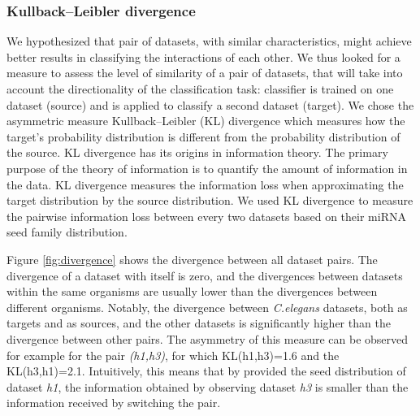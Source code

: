 \documentclass{bmcart}
\begin{document}
\subsubsection*{Kullback–Leibler divergence}
We hypothesized that pair of datasets, with similar characteristics, might achieve better results in classifying the interactions of each other. We thus looked for a measure to assess the level of similarity of a pair of datasets, that will take into account the directionality of the classification task: classifier is trained on one dataset (source) and is applied to classify a second dataset (target).
We chose the asymmetric measure Kullback–Leibler (KL) divergence which measures how the target's probability distribution is different from the probability distribution of the source. KL divergence has its origins in information theory. The primary purpose of the theory of information is to quantify the amount of information in the data. KL divergence measures the information loss when approximating the target distribution by the source distribution. We used KL divergence to measure the pairwise information loss between every two datasets based on their miRNA seed family distribution.

Figure \ref{fig:divergence} shows the divergence between all dataset pairs. The divergence of a dataset with itself is zero, and the divergences between datasets within the same organisms are usually lower than the divergences between different organisms. Notably, the divergence between \textit{C.elegans} datasets, both as targets and as sources, and the other datasets is significantly higher than the divergence between other pairs. The asymmetry of this measure can be observed for example for the pair \textit{(h1,h3)}, for which KL(h1,h3)=1.6 and the KL(h3,h1)=2.1. Intuitively, this means that by provided the seed distribution of dataset \textit{h1}, the information obtained by observing dataset \textit{h3} is smaller than the information received by switching the pair.
\end{document}
